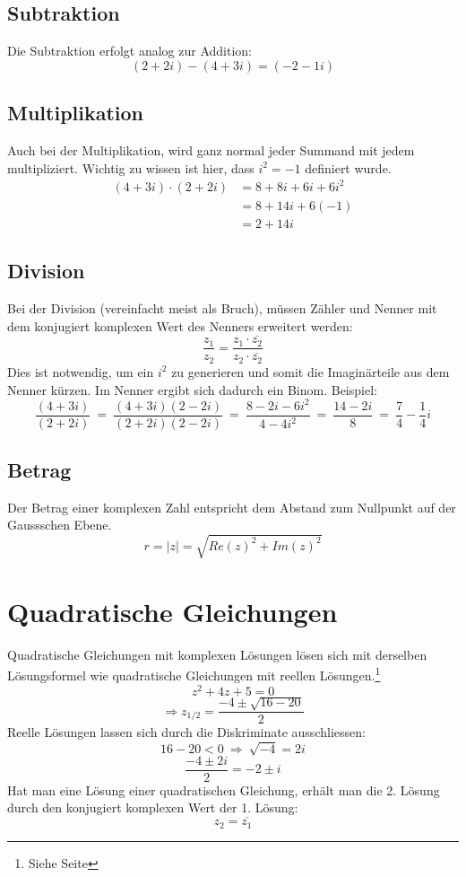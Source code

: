 \documentclass[12pt,a4paper]{scrbook}
\begin{document}
\subsection{Subtraktion}
Die Subtraktion erfolgt analog zur Addition:
\[(2+2i) - (4+3i) = (-2-1i)\]

\subsection{Multiplikation}
Auch bei der Multiplikation, wird ganz normal jeder Summand mit jedem multipliziert.
Wichtig zu wissen ist hier, dass $i^2 = -1$ definiert wurde.
\begin{equation*}
\begin{split}
(4+3i) \cdot (2+2i) & = 8 + 8i + 6i + 6i^2 \\
 & = 8 + 14i + 6(-1)\\
 & = 2 + 14i
\end{split}
\end{equation*}

\subsection{Division}
Bei der Division (vereinfacht meist als Bruch), müssen Zähler und Nenner mit
dem konjugiert komplexen Wert des Nenners erweitert werden:
\[\frac{z_1}{z_2} = \frac{z_1 \cdot \overline{z_2}}{z_2 \cdot \overline{z_2}}\]
Dies ist notwendig, um ein $i^2$ zu generieren und somit die Imaginärteile aus dem
Nenner kürzen. Im Nenner ergibt sich dadurch ein Binom. Beispiel:
\[
\frac{(4+3i)}{(2+2i)} ~ = ~ \frac{(4+3i)(2-2i)}{(2+2i)(2-2i)}
~ = ~ \frac{8-2i-6i^2}{4-4i^2} ~ = ~ \frac{14-2i}{8} ~ = ~ \frac{7}{4} - \frac{1}{4}i
\]

\subsection{Betrag}
\label{komplex_betrag}
Der Betrag einer komplexen Zahl entspricht dem Abstand zum Nullpunkt auf der
Gaussschen Ebene.
\[r = \vert z \vert = \sqrt{Re(z)^2 + Im(z)^2} \]

\section{Quadratische Gleichungen}
Quadratische Gleichungen mit komplexen Lösungen lösen sich mit derselben
Lösungsformel wie quadratische Gleichungen mit reellen Lösungen.\footnote{Siehe Seite \pageref{quadratische_gleichungen}}
\[z^2 + 4z + 5 = 0\]
\[\Rightarrow z_{1/2} = \frac{-4 \pm \sqrt{16-20}}{2} \]
Reelle Lösungen lassen sich durch die Diskriminate ausschliessen:
\[16-20 < 0 ~ \Longrightarrow ~ \sqrt{-4} = 2i\]
\[\frac{-4 \pm 2i}{2} = -2 \pm i\]
Hat man eine Lösung einer quadratischen Gleichung, erhält man die 2. Lösung durch
den konjugiert komplexen Wert der 1. Lösung:
\[z_2 = \overline{z_1}\] 
\end{document}
